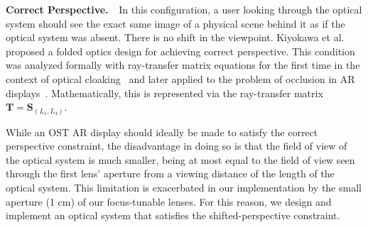 {\bf Correct Perspective. $\,\,$}
In this configuration, a user looking through the optical system should see the exact same image of a physical scene behind it as if the optical system was absent. There is no shift in the viewpoint. Kiyokawa et al.~\cite{Kiyokawa2003} proposed a folded optics design for achieving correct perspective. This condition was analyzed formally with ray-transfer matrix equations for the first time in the context of optical cloaking~\cite{Choi2015} and later applied to the problem of occlusion in AR displays~\cite{Howlett2017}. Mathematically, this is represented via the ray-transfer matrix $\mathbf{T} = \mathbf{S}_{(L_1,L_4)}$.

While an OST AR display should ideally be made to satisfy the correct perspective constraint, the disadvantage in doing so is that the field of view of the optical system is much smaller, being at most equal to the field of view seen through the first lens' aperture from a viewing distance of the length of the optical system. This limitation is exacerbated in our implementation by the small aperture (1 cm) of our focus-tunable lenses. For this reason, we design and implement an optical system that satisfies the shifted-perspective constraint. 



